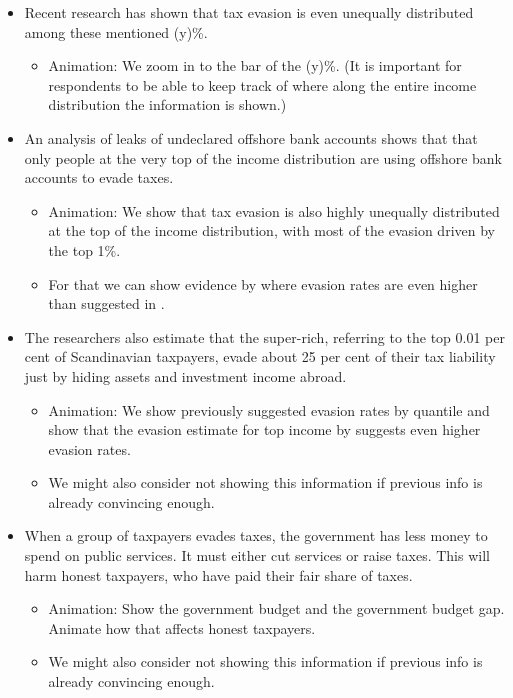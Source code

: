 \documentclass[11pt]{article}
\begin{document}
\begin{itemize}
    \item Recent research has shown that tax evasion is even unequally distributed among these mentioned (y)\%. 
    \begin{itemize}
        \item Animation: We zoom in to the bar of the (y)\%. (It is important for respondents to be able to keep track of where along the entire income distribution the information is shown.) 
    \end{itemize}
    \item An analysis of leaks of undeclared offshore bank accounts shows that that only people at the very top of the income distribution are using offshore bank accounts to evade taxes. 
    \begin{itemize}
        \item Animation: We show that tax evasion is also highly unequally distributed at the top of the income distribution, with most of the evasion driven by the top 1\%.
        \item For that we can show evidence by \cite{alstadsaeter2019tax} where evasion rates are even higher than suggested in \cite{johns2010distribution}. 
    \end{itemize} 
\item The researchers also estimate that the super-rich, referring to the top 0.01 per cent of Scandinavian taxpayers, evade about 25 per cent of their tax liability just by hiding assets and investment income abroad. 
\begin{itemize}
    \item Animation: We show previously suggested evasion rates by quantile and show that the evasion estimate for top income by \cite{alstadsaeter2019tax} suggests even higher evasion rates. 
    \item We might also consider not showing this information if previous info is already convincing enough. 
\end{itemize}
\item When a group of taxpayers evades taxes, the government has less money to spend on public services. It must either cut services or raise taxes. This will harm honest taxpayers, who have paid their fair share of taxes. 
\begin{itemize}
    \item Animation: Show the government budget and the government budget gap. Animate how that affects honest taxpayers.
    \item We might also consider not showing this information if previous info is already convincing enough. 

\end{itemize}
\end{itemize}
\end{document}
